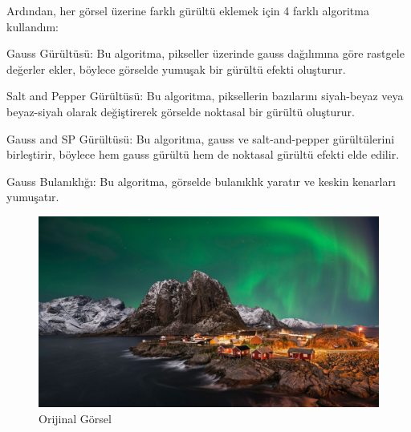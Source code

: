 \documentclass{article}
\begin{document}
\noindent Ardından, her görsel üzerine farklı gürültü eklemek için 4 farklı algoritma kullandım:\vspace{0,5cm}

\noindent Gauss Gürültüsü: Bu algoritma\cite{Github}, pikseller üzerinde gauss dağılımına göre rastgele değerler ekler, böylece görselde yumuşak bir gürültü efekti oluşturur.\vspace{0,5cm}

\noindent Salt and Pepper Gürültüsü: Bu algoritma\cite{Github2}, piksellerin bazılarını siyah-beyaz veya beyaz-siyah olarak değiştirerek görselde noktasal bir gürültü oluşturur.\vspace{0,5cm}

\noindent Gauss and SP Gürültüsü: Bu algoritma, gauss ve salt-and-pepper gürültülerini birleştirir, böylece hem gauss gürültü hem de noktasal gürültü efekti elde edilir.\vspace{0,5cm}

\noindent Gauss Bulanıklığı: Bu algoritma\cite{OpenCV}, görselde bulanıklık yaratır ve keskin kenarları yumuşatır.\vspace{0,5cm}

\begin{figure}
     \centering
 \noindent \includegraphics[angle=360,width=1.1\textwidth]{9.jpg}\centering 
  \caption{Orijinal Görsel}
  \label{fig:resim_etiketi}
\end{figure}
\end{document}

